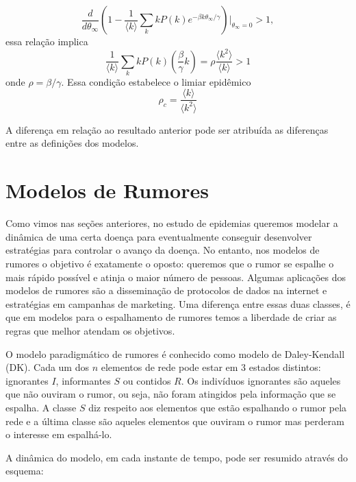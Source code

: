 \documentclass[a4paper,11pt]{report}
\begin{document}
\begin{equation}
\frac{d}{d\theta_{\infty}}\left(1-\frac{1}{\langle k\rangle}\sum_k kP(k)e^{-\beta k \theta_{\infty}/\gamma}\right)\Bigg|_{\theta_{\infty}=0}>1,
\end{equation}
essa rela\c{c}\~ao implica
\begin{equation}
\frac{1}{\langle k\rangle}\sum_{k}kP(k)\left(\frac{\beta}{\gamma} k\right)=\rho\frac{\langle k^2\rangle}{\langle k\rangle}>1
\end{equation}
onde $\rho=\beta/\gamma$. Essa condi\c{c}\~ao estabelece o limiar epid\^emico
\begin{equation}
\rho_c=\frac{\langle k\rangle}{\langle k^2\rangle}
\end{equation} 

A diferen\c{c}a em rela\c{c}\~ao ao resultado anterior pode ser atribu\'ida as diferen\c{c}as entre as defini\c{c}\~oes dos modelos. 
 
\section{Modelos de Rumores}

Como vimos nas se\c{c}\~oes anteriores, no estudo de epidemias queremos modelar a din\^amica de uma certa doen\c{c}a para eventualmente conseguir desenvolver estrat\'egias para controlar o avan\c{c}o da doen\c{c}a. No entanto, nos modelos de rumores o objetivo \'e exatamente o oposto: queremos que o rumor se espalhe o mais r\'apido poss\'ivel e atinja o maior n\'umero de pessoas. Algumas aplica\c{c}\~oes dos modelos de rumores s\~ao a dissemina\c{c}\~ao de protocolos de dados na internet e estrat\'egias em campanhas de marketing. Uma diferen\c{c}a entre essas duas classes, \'e que em modelos para o espalhamento de rumores temos a liberdade de criar as regras que melhor atendam os objetivos. 

O modelo paradigm\'atico de rumores \'e conhecido como modelo de Daley-Kendall (DK). Cada um dos $n$ elementos de rede pode estar em 3 estados distintos: ignorantes $I$, informantes $S$ ou contidos $R$. Os indiv\'iduos ignorantes s\~ao aqueles que n\~ao ouviram o rumor, ou seja, n\~ao foram atingidos pela informa\c{c}\~ao que se espalha. A classe $S$ diz respeito aos elementos que est\~ao espalhando o rumor pela rede e a \'ultima classe s\~ao aqueles elementos que ouviram o rumor mas perderam o interesse em espalh\'a-lo.

A din\^amica do modelo, em cada instante de tempo, pode ser resumido atrav\'es do esquema:
\end{document}
